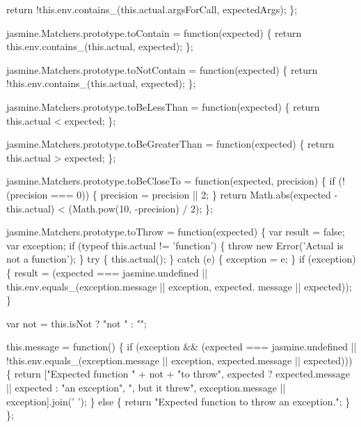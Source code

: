 \begin{DoxyCodeInclude}
  \textcolor{keywordflow}{return} !this.env.contains\_(this.actual.argsForCall, expectedArgs);
\};

jasmine.Matchers.prototype.toContain = \textcolor{keyword}{function}(expected) \{
  \textcolor{keywordflow}{return} this.env.contains\_(this.actual, expected);
\};

jasmine.Matchers.prototype.toNotContain = \textcolor{keyword}{function}(expected) \{
  \textcolor{keywordflow}{return} !this.env.contains\_(this.actual, expected);
\};

jasmine.Matchers.prototype.toBeLessThan = \textcolor{keyword}{function}(expected) \{
  \textcolor{keywordflow}{return} this.actual < expected;
\};

jasmine.Matchers.prototype.toBeGreaterThan = \textcolor{keyword}{function}(expected) \{
  \textcolor{keywordflow}{return} this.actual > expected;
\};

jasmine.Matchers.prototype.toBeCloseTo = \textcolor{keyword}{function}(expected, precision) \{
  \textcolor{keywordflow}{if} (!(precision === 0)) \{
    precision = precision || 2;
  \}
  \textcolor{keywordflow}{return} Math.abs(expected - this.actual) < (Math.pow(10, -precision) / 2);
\};

jasmine.Matchers.prototype.toThrow = \textcolor{keyword}{function}(expected) \{
  var result = \textcolor{keyword}{false};
  var exception;
  \textcolor{keywordflow}{if} (typeof this.actual != \textcolor{stringliteral}{'function'}) \{
    \textcolor{keywordflow}{throw} \textcolor{keyword}{new} Error(\textcolor{stringliteral}{'Actual is not a function'});
  \}
  \textcolor{keywordflow}{try} \{
    this.actual();
  \} \textcolor{keywordflow}{catch} (e) \{
    exception = e;
  \}
  \textcolor{keywordflow}{if} (exception) \{
    result = (expected === jasmine.undefined || this.env.equals\_(exception.message || exception, expected.
      message || expected));
  \}

  var not = this.isNot ? \textcolor{stringliteral}{"not "} : \textcolor{stringliteral}{""};

  this.message = \textcolor{keyword}{function}() \{
    \textcolor{keywordflow}{if} (exception && (expected === jasmine.undefined || !\textcolor{keyword}{this}.env.equals\_(exception.message || exception, 
      expected.message || expected))) \{
      \textcolor{keywordflow}{return} [\textcolor{stringliteral}{"Expected function "} + not + \textcolor{stringliteral}{"to throw"}, expected ? expected.message || expected : \textcolor{stringliteral}{"an
       exception"}, \textcolor{stringliteral}{", but it threw"}, exception.message || exception].join(\textcolor{charliteral}{' '});
    \} \textcolor{keywordflow}{else} \{
      \textcolor{keywordflow}{return} \textcolor{stringliteral}{"Expected function to throw an exception."};
    \}
  \};


\end{DoxyCodeInclude}
